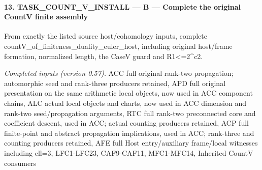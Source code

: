 \documentclass[11pt,a4paper]{article}
\numberwithin{equation}{section}
\theoremstyle{remark}\newtheorem{remark}[theorem]{Remark}
\begin{document}
\paragraph{13. TASK\_\allowbreak COUNT\_\allowbreak V\_\allowbreak INSTALL — B — Complete the original CountV finite assembly}

From exactly the listed source host/cohomology inputs, complete countV\_\allowbreak of\_\allowbreak finiteness\_\allowbreak duality\_\allowbreak euler\_\allowbreak host, including original host/frame formation, normalized length, the CaseV guard and R1<=2\textasciicircum{}c2.

\emph{Completed inputs (version 0.57).} ACC full original rank-two propagation; automorphic seed and rank-three producers retained, APD full original presentation on the same arithmetic local objects, now used in ACC component chains, ALC actual local objects and charts, now used in ACC dimension and rank-two seed/propagation arguments, RTC full rank-two preconnected core and coefficient descent, used in ACC; actual counting producers retained, ACP full finite-point and abstract propagation implications, used in ACC; rank-three and counting producers retained, AFE full Host entry/auxiliary frame/local witnesses including ell=3, LFC1-LFC23, CAF9-CAF11, MFC1-MFC14, Inherited CountV consumers
\end{document}
